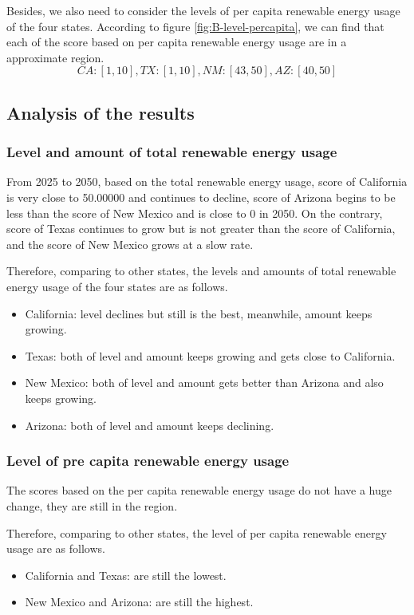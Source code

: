 \documentclass[a4paper,11pt]{article}
\begin{document}
\par Besides, we also need to consider the levels of per capita renewable energy usage of the four states. According to figure \ref{fig:B-level-percapita}, we can find that each of the score based on per capita renewable energy usage are in a approximate region.
\[
CA:[1,10], TX:[1,10], NM:[43,50], AZ:[40,50]
\]

\subsection{Analysis of the results}
\subsubsection{Level and amount of total renewable energy usage}
\par From 2025 to 2050, based on the total renewable energy usage, score of California is very close to 50.00000 and continues to decline, score of Arizona begins to be less than the score of New Mexico and is close to 0 in 2050. On the contrary, score of Texas continues to grow but is not greater than the score of California, and the score of New Mexico grows at a slow rate.
\par Therefore, comparing to other states, the levels and amounts of total renewable energy usage of the four states are as follows.
\begin{itemize}
    \item California: level declines but still is the best, meanwhile, amount keeps growing.
    \item Texas: both of level and amount keeps growing and gets close to California.
    \item New Mexico: both of level and amount gets better than Arizona and also keeps growing.
    \item Arizona: both of level and amount keeps declining.
\end{itemize}
\subsubsection{Level of pre capita renewable energy usage}
\par The scores based on the per capita renewable energy usage do not have a huge change, they are still in the region.
\par Therefore, comparing to other states, the level of per capita renewable energy usage are as follows.
\begin{itemize}
    \item California and Texas: are still the lowest.
    \item New Mexico and Arizona: are still the highest.
\end{itemize}
\end{document}
